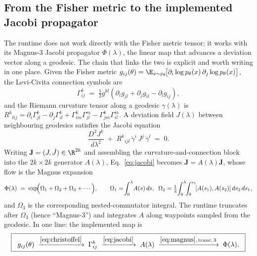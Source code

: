\documentclass[11pt]{article}
\begin{document}
\subsection{From the Fisher metric to the implemented Jacobi propagator}
\label{sec:fisher-to-jacobi}
The runtime does not work directly with the Fisher metric tensor; it works
with its Magnus-3 Jacobi propagator $\Phi(\lambda)$, the linear map that
advances a deviation vector along a geodesic.  The chain that links the two
is explicit and worth writing in one place.  Given the Fisher metric
$g_{ij}(\theta)=\E_{x\sim p_\theta}\!\bigl[\partial_i\log p_\theta(x)\,
\partial_j\log p_\theta(x)\bigr]$, the Levi-Civita connection symbols are
\begin{equation}
\Gamma^k_{ij}\;=\;\tfrac{1}{2}g^{kl}\!\left(\partial_i g_{jl}+\partial_j g_{il}-\partial_l g_{ij}\right),
\label{eq:christoffel}
\end{equation}
and the Riemann curvature tensor along a geodesic $\gamma(\lambda)$ is
$R^k{}_{lij}=\partial_i\Gamma^k_{jl}-\partial_j\Gamma^k_{il}
+\Gamma^k_{im}\Gamma^m_{jl}-\Gamma^k_{jm}\Gamma^m_{il}$.  A
deviation field $J(\lambda)$ between neighbouring geodesics satisfies the
Jacobi equation
\begin{equation}
\frac{D^2 J^k}{d\lambda^2}\;+\;R^k{}_{ijl}\,\dot\gamma^i\,J^j\,\dot\gamma^l\;=\;0.
\label{eq:jacobi}
\end{equation}
Writing $\mathbf{J}=(J,\dot J)\in\R^{2k}$ and assembling the
curvature-and-connection block into the $2k\times2k$ generator
$A(\lambda)$, Eq.~\eqref{eq:jacobi} becomes
$\dot{\mathbf{J}}=A(\lambda)\mathbf{J}$, whose flow is the Magnus expansion
\cite{magnus1954}
\begin{equation}
\Phi(\lambda)\;=\;\exp\!\Bigl(\Omega_1+\Omega_2+\Omega_3+\cdots\Bigr),\qquad
\Omega_1=\!\int_0^\lambda\!A(s)\,ds,\;\;
\Omega_2=\tfrac{1}{2}\!\int_0^\lambda\!\!\int_0^{s_1}\![A(s_1),A(s_2)]\,ds_2\,ds_1,
\label{eq:magnus}
\end{equation}
and $\Omega_3$ is the corresponding nested-commutator integral.  The runtime
truncates after $\Omega_3$ (hence ``Magnus-3'') and integrates $A$ along
waypoints sampled from the geodesic.  In one line: the implemented map is
\begin{equation}
\boxed{\;\;g_{ij}(\theta)\;\xrightarrow{\eqref{eq:christoffel}}\;\Gamma^k_{ij}\;\xrightarrow{\eqref{eq:jacobi}}\;A(\lambda)\;\xrightarrow{\eqref{eq:magnus},\,\text{trunc.\,3}}\;\Phi(\lambda).\;\;}
\label{eq:fisher-to-phi}
\end{equation}
\end{document}
